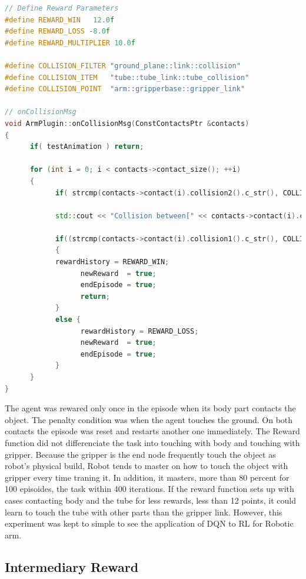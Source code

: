 \documentclass[10pt,journal,compsoc]{IEEEtran}
\begin{document}
\begin{lstlisting}[language=C++, caption={Reward Function},label={list:RewardFunction0}]
// Define Reward Parameters
#define REWARD_WIN   12.0f
#define REWARD_LOSS -8.0f
#define REWARD_MULTIPLIER 10.0f

#define COLLISION_FILTER "ground_plane::link::collision"
#define COLLISION_ITEM   "tube::tube_link::tube_collision"
#define COLLISION_POINT  "arm::gripperbase::gripper_link"

// onCollisionMsg
void ArmPlugin::onCollisionMsg(ConstContactsPtr &contacts)
{
      if( testAnimation ) return;
      
      for (int i = 0; i < contacts->contact_size(); ++i)
      {
            if( strcmp(contacts->contact(i).collision2().c_str(), COLLISION_FILTER) == 0 ) continue;
            
            std::cout << "Collision between[" << contacts->contact(i).collision1() << "] and [" << contacts->contact(i).collision2() << "]\n";
            
            if((strcmp(contacts->contact(i).collision1().c_str(), COLLISION_ITEM) == 0) && (strcmp(contacts->contact(i).collision2().c_str(), COLLISION_POINT) == 0))
            {
            rewardHistory = REWARD_WIN;
                  newReward  = true;
                  endEpisode = true;
                  return;
            }
            else {
                  rewardHistory = REWARD_LOSS;
                  newReward  = true;
                  endEpisode = true;
            }
      }
}
\end{lstlisting}
The agent was rewared only once in the episode when its body part contacts the object. The penalty condition was when the agent touches the ground. On both contacts the episode was reset and restarts another one immediately.
The Reward function did not differenciate the task into touching with body and touching with gripper. Because the gripper is the end node frequently touch the object as robot's physical build, Robot tends to master on how to touch the object with gripper every time traning it. In addition, it masters, more than 80 percent for 100 episoides, the task within 400 iterations.
If the reward function sets up with cases contacting body and the tube for less rewards, less than 12 points, it could learn to touch the tube with other parts than the gripper link. However, this experiment was kept to simple to see the application of DQN to RL for Robotic arm.

\subsection{Intermediary Reward}
\end{document}
